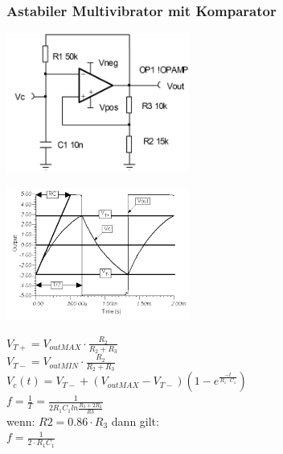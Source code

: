 \subsubsection{Astabiler Multivibrator mit Komparator}
	\begin{multicols}{3}
		\includegraphics[width=6cm]{./bilder/osziRechteck.png}
		\columnbreak
		
		\includegraphics[width=6cm]{./bilder/osziRechteckSignal.png}
		\columnbreak
		
		$V_{T+}=V_{outMAX}\cdot\frac{R_2}{R_2+R_3}$\\
		$V_{T-}=V_{outMIN}\cdot\frac{R_2}{R_2+R_3}$\\
		$V_c(t)=V_{T-}+\left(V_{outMAX}-V_{T-}\right)\left(1-e^{\frac{-t}{R_1\cdot
		C_1}}\right)$\\
		$f=\frac{1}{T}=\frac{1}{2R_1C_1 ln \frac{R_3+2R_2}{R3}}$\\
		wenn: $R2 = 0.86 \cdot R_3$ dann gilt:\\
		$f=\frac{1}{2\cdot R_1C_1}$
	\end{multicols}
